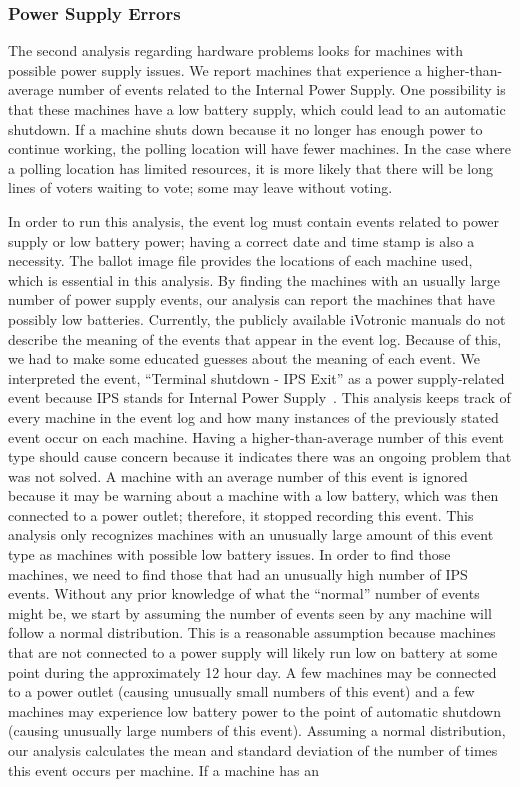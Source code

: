 \subsubsection{Power Supply Errors}
The second analysis regarding hardware problems looks for machines with possible power supply issues.  We report machines that experience a higher-than-average number of events related to the Internal Power Supply. One possibility is that these machines have a low battery supply, which could lead to an automatic shutdown.  If a machine shuts down because it no longer has enough power to continue working, the polling location will have fewer machines.  In the case where a polling location has limited resources, it is more likely that there will be long lines of voters waiting to vote; some may leave without voting.  

In order to run this analysis, the event log must contain events related to power supply or low battery power; having a correct date and time stamp is also a necessity.  The ballot image file provides the locations of each machine used, which is essential in this analysis.  By finding the machines with an usually large number of power supply events, our analysis can report the machines that have possibly low batteries.  Currently, the publicly available iVotronic manuals do not describe the meaning of the events that appear in the event log.  Because of this, we had to make some educated guesses about the meaning of each event.  We interpreted the event, \textquotedblleft Terminal shutdown - IPS Exit\textquotedblright \hspace{1 mm} as a power supply-related event because IPS stands for Internal Power Supply~\cite{email2010}.  This analysis keeps track of every machine in the event log and how many instances of the previously stated event occur on each machine.  Having a higher-than-average number of this event type should cause concern because it indicates there was an ongoing problem that was not solved. A machine with an average number of this event is ignored because it may be warning about a machine with a low battery, which was then connected to a power outlet; therefore, it stopped recording this event. This analysis only recognizes machines with an unusually large amount of this event type as machines with possible low battery issues. In order to find those machines, we need to find those that had an unusually high number of IPS events. Without any prior knowledge of what the \textquotedblleft normal\textquotedblright \hspace{1 mm} number of events might be, we start by assuming the number of events seen by any machine will follow a normal distribution. This is a reasonable assumption because machines that are not connected to a power supply will likely run low on battery at some point during the approximately 12 hour day. A few machines may be connected to a power outlet (causing unusually small numbers of this event) and a few machines may experience low battery power to the point of automatic shutdown (causing unusually large numbers of this event).  Assuming a normal distribution, our analysis calculates the mean and standard deviation of the number of times this event occurs per machine.  If a machine has an 